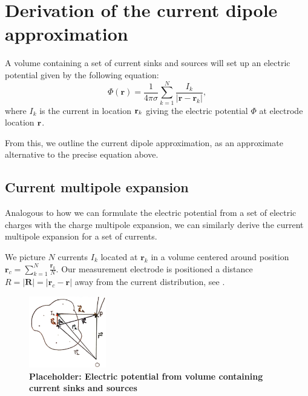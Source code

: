 \chapter{Derivation of the current dipole approximation}
\label{app:dipoleappendix}
A volume containing a set of current sinks and sources will set up an electric potential given by the following equation:
\begin{equation}\label{eq:point_source}
\Phi(\mathbf{r}) = \frac{1}{4 \pi \sigma} \sum_{k=1}^N \frac{I_k}{|\mathbf{r} - \mathbf{r}_k|},
\end{equation}
where $I_k$ is the current in location ${\bf r}_k$ giving the electric potential $\Phi$ at electrode location ${\bf r}$.

From this, we outline the current dipole approximation, as an approximate alternative to the precise equation above.

\section{Current multipole expansion}
Analogous to how we can formulate the electric potential from a set of electric charges with the charge multipole expansion, we can similarly derive the current multipole expansion for a set of currents.

We picture $N$ currents $I_k$ located at $\mathbf{r}_k$ in a volume centered around position $\mathbf{r}_c = \sum_{k = 1}^N \frac{\mathbf{r}_k}{N}$. Our measurement electrode is positioned a distance $R = |\mathbf{R}| = |\mathbf{r}_c - \mathbf{r}|$ away from the current distribution, see .

\begin{figure}[!ht]
	\begin{center}
		\includegraphics[width=0.3\textwidth]{Figures/placeholder_appB1.png}
	\end{center}
	\caption{\textbf{Placeholder: Electric potential from volume containing current sinks and sources}}
	\label{fig:current_volume}
\end{figure}

